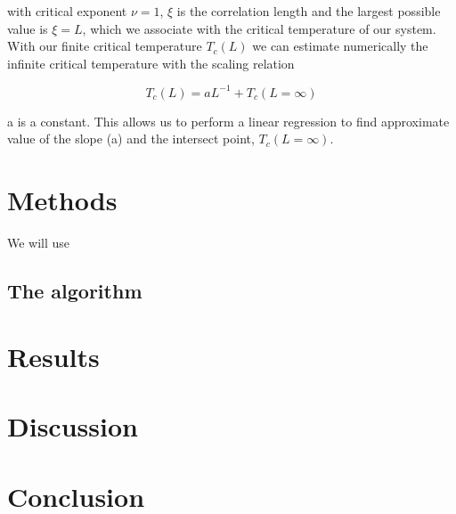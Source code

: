 \documentclass[english,notitlepage,reprint,nofootinbib]{revtex4-2}  %
\begin{document}
	with critical exponent $\nu=1$, $\xi$ is the correlation length and the largest possible 
	value is $\xi=L$, which we associate with the critical temperature of our system. \\
	
	With our finite critical temperature $T_c(L)$  we can estimate numerically the infinite
	critical temperature with the scaling relation 
	
	\begin{equation}
		T_c(L) = aL^{-1} + T_c(L=\infty) \label{eq:scaling relation}
	\end{equation}
	
	a is a constant. This allows us to perform a linear regression to find approximate value 
	of the slope (a) and the intersect point, $T_c(L=\infty)$.
	
	
	
	\section{Methods}\label{sec:methods}
	We will use

	
	\subsection*{The algorithm}\label{sec:algorithm}

	\section{Results}\label{sec:results}

	
	
	\section{Discussion}\label{sec:discussion}

	
	\section{Conclusion}\label{sec:conclusion}

	\onecolumngrid
	
	
	
	
\end{document}
